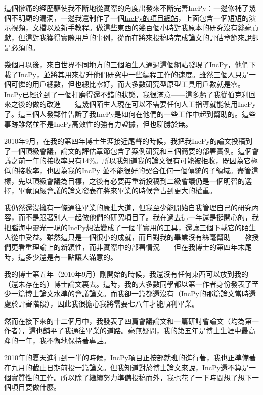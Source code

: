 \documentclass[12pt,UTF8,nofonts]{book}
\begin{document}
\breakline

這個慘痛的經歷驅使我不斷地從實際的角度出發來不斷完善IncPy：一邊修補了幾個不明顯的漏洞，一邊我還制作了一個\href{http://www.pgbovine.net/incpy.html}{IncPy的項目網站}，上面包含一個短短的演示視頻，文檔以及新手教程。做這些東西的幾百個小時對我原本的研究沒有絲毫貢獻，但這對我獲得實際用戶的事例，從而在將來投稿時完成論文的評估章節來說卻是必須的。

幾個月以後，來自世界不同地方的三個陌生人通過這個網站發現了IncPy，他們下載了IncPy，並將其用來提升他們研究中一些編程工作的速度。雖然三個人只是一個可憐的用戶總數，但也總比零好，而大多數研究型原型工具用戶數就是零。IncPy已經達到了一個打磨得還不錯的狀態，我很滿意——這多虧了我從伯克利回來之後的做的改進——這幾個陌生人現在可以不需要任何人工指導就能使用IncPy了。這三個人發郵件告訴了我IncPy是如何在他們的一些工作中起到幫助的。這些事跡雖然並不是IncPy高效性的強有力證據，但也聊勝於無。

2010年9月，在我的第四年博士生涯接近尾聲的時候，我把我IncPy的論文投稿到了一個頂級會議，論文的評估章節包含了案例研究和三個簡要的部署實例。這個會議之前一年的接收率只有14\%。所以我知道我的論文很有可能被拒收，既因為它極低的接收率，也因為我的IncPy 並不能很好的契合任何一個傳統的子領域。盡管這樣，先以頂級會議為目標，之後有必要再重新投稿到二級會議仍是一個明智的選擇，畢竟頂級會議的論文發表在將來畢業的時候會占到更大的權重。

我仍然還沒擁有一條通往畢業的康莊大道，但我至少能開始自我管理自己的研究內容，而不是跟著別人一起做他們的研究項目了。我在過去這一年還是挺開心的，我把腦海中靈光一現的IncPy想法變成了一個半實用的工具，還讓三個下載它的陌生人從中受益。雖然這只是一個很小的成就，而且對我的畢業沒有絲毫幫助——教授們更看重理論上的新穎性，而非實際中的部署情況——但在我博士的第四年末尾時，這多少還是有一點讓人滿意的。

我的博士第五年（2010年9月）剛開始的時候，我還沒有任何東西可以放到我的（還未存在的）博士論文裏去。這時，我的大多數同學都以第一作者身份發表了至少一篇博士論文水準的會議論文。而我卻一篇都還沒有（IncPy的那篇論文當時還處於評審階段），因此我很擔心我將需要七八年才能順利畢業。

然而在接下來的十二個月中，我發表了四篇會議論文和一篇研討會論文（均為第一作者），這也鋪平了我通往畢業的道路。毫無疑問，我的第五年是博士生涯中最高產的一年，我不懈地保持著專註。

\breakline

2010年的夏天進行到一半的時候，IncPy項目正按部就班的進行著，我也正準備著在九月的截止日期前投一篇論文。但我知道對於博士論文來說，IncPy還不算是一個實質性的工作。所以除了繼續努力準備投稿而外，我也花了一下時間想了想下一個項目要做什麼。
\end{document}
